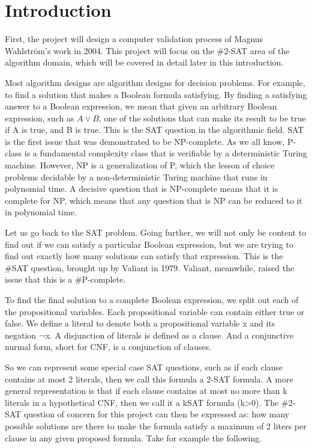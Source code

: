 \documentclass{sigchi}
\def\plainkeywords{\#SAT; \#2SAT; graph theory; complexity theory}
\begin{document}
\keywords{\plainkeywords}

\section{Introduction}
First, the project will design a computer validation process of Magnus Wahlström's work in 2004.\cite{10.1016/j.tcs.2004.10.037} This project will focus on the \#2-SAT area of the algorithm domain, which will be covered in detail later in this introduction.

Most algorithm designs are algorithm designs for decision problems. For example, to find a solution that makes a Boolean formula satisfying. By finding a satisfying answer to a Boolean expression, we mean that given an arbitrary Boolean expression, such as $A \vee B $, one of the solutions that can make its result to be true if A is true, and B is true. This is the SAT question in the algorithmic field. SAT is the first issue that was demonstrated to be NP-complete.\cite{10.1145/800157.805047} As we all know, P-class is a fundamental complexity class that is verifiable by a deterministic Turing machine. However, NP is a generalization of P, which the lesson of choice problems decidable by a non-deterministic Turing machine that runs in polynomial time. A decisive question that is NP-complete means that it is complete for NP, which means that any question that is NP can be reduced to it in polynomial time.

Let us go back to the SAT problem. Going further, we will not only be content to find out if we can satisfy a particular Boolean expression, but we are trying to find out exactly how many solutions can satisfy that expression. This is the \#SAT question, brought up by Valiant in 1979.\cite{10.1016/0304-3975(79)90044-6} Valiant, meanwhile, raised the issue that this is a \#P-complete.

To find the final solution to a complete Boolean expression, we split out each of the propositional variables. Each propositional variable can contain either true or false. We define a literal to denote both a propositional variable x and its negation ¬x. A disjunction of literals is defined as a clause. And a conjunctive nurmal form, short for CNF, is a conjunction of clauses.

So we can represent some special case SAT questions, such as if each clause contains at most 2 literals, then we call this formula a 2-SAT formula. A more general representation is that if each clause contains at most no more than k literals in a hypothetical CNF, then we call it a k\-SAT formula (k>0). The \#2-SAT question of concern for this project can then be expressed as: how many possible solutions are there to make the formula satisfy a maximum of 2 liters per clause in any given proposed formula. Take for example the following.
\end{document}
